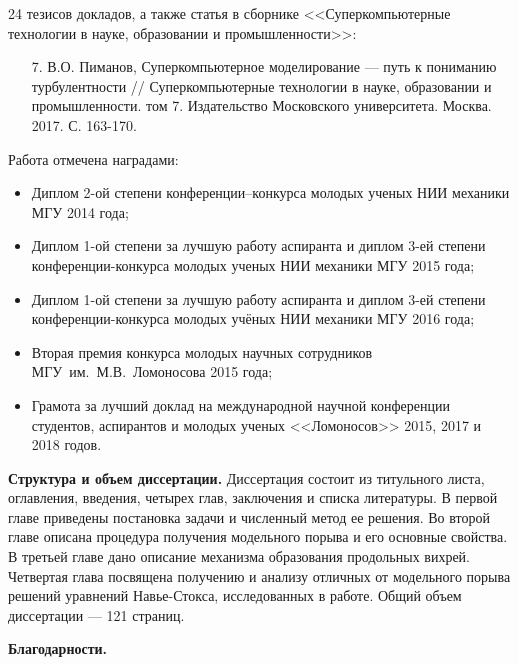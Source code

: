 24 тезисов докладов, а также статья в сборнике <<Суперкомпьютерные технологии в науке, образовании и промышленности>>:
\begin{enumerate}
\item[7.] В.О. Пиманов, Суперкомпьютерное моделирование --- путь к пониманию турбулентности // Суперкомпьютерные технологии в науке, образовании и промышленности. том 7. Издательство Московского университета. Москва. 2017. С.  163-170. 
\end{enumerate}
Работа отмечена наградами:
\begin{itemize}
\item Диплом 2-ой степени конференции--конкурса молодых ученых НИИ механики МГУ 2014 года;
\item Диплом 1-ой степени за лучшую работу аспиранта и диплом 3-ей степени конференции-конкурса молодых ученых НИИ механики МГУ 2015 года;
\item Диплом 1-ой степени за лучшую работу аспиранта и диплом 3-ей степени конференции-конкурса молодых учёных НИИ механики МГУ 2016 года;
\item Вторая премия конкурса молодых научных сотрудников МГУ~им.~М.В.~Ломоносова 2015 года;
\item Грамота за лучший доклад на международной научной конференции студентов, аспирантов и молодых ученых <<Ломоносов>> 2015, 2017 и 2018 годов.
\end{itemize}


{\bf Структура и объем диссертации.} 
Диссертация состоит из титульного листа, оглавления, введения, четырех глав, заключения и списка литературы. В первой главе приведены постановка задачи и численный метод ее решения. Во второй главе описана процедура получения модельного порыва и его основные свойства. В третьей главе дано описание механизма образования продольных вихрей. Четвертая глава посвящена получению и анализу отличных от модельного порыва решений уравнений Навье-Стокса, исследованных в работе. Общий объем диссертации --- 121 страниц. %

{\bf Благодарности.}


